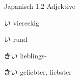 \begin{multicols*}{2}
\begin{flushleft}
\begin{labeling}{Japanisch 1.2 Adjektive}
	\item [\ruby{四角}{しかく}い] viereckig
	\item [\ruby{円}{まる}い] rund
	
	\item [\ruby{好}{す}きい] lieblings-
	\item [\ruby{大好}{だいす}きい] geliebter, liebster
\end{labeling}
\end{flushleft}
\end{multicols*}

\clearpage